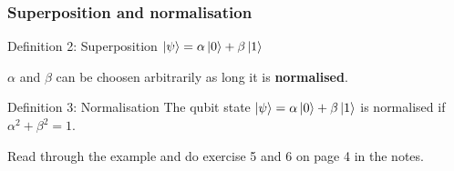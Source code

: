 \documentclass[10pt]{beamer}
\begin{document}
\begin{frame}
  \frametitle{Superposition and normalisation}
  \begin{block}{Definition 2: Superposition}
    $\ket{\psi}=\alpha \ket{0}+\beta \ket{1}$

    $\alpha$ and $\beta$ can be choosen arbitrarily as long it is \textbf{normalised}.
  \end{block}
  
  \begin{block}{Definition 3: Normalisation}
    The qubit state $\ket{\psi} = \alpha \ket{0} + \beta \ket{1}$ is normalised if $\alpha^2+\beta^2=1$. 
  \end{block}

   Read through the example and do exercise 5 and 6 on page 4 in the notes.
\end{frame}
\end{document}
